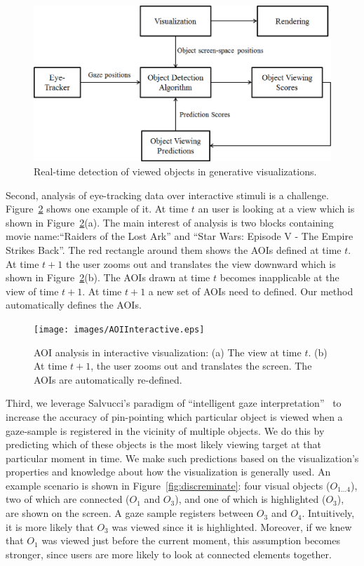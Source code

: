 \begin{figure}[htb]
  \centering
  \includegraphics[width=\linewidth]{images/systemBlockDiagram.eps}
  \caption{Real-time detection of viewed objects in generative visualizations.}
	\label{fig:systemBlockDiagram}
\end{figure}

Second, analysis of eye-tracking data over interactive stimuli is a challenge. Figure~\ref{fig:AOIInteractive} shows one example of it. At time $t$ an user is looking at a view which is shown in Figure~\ref{fig:AOIInteractive}(a). The main interest of analysis is two blocks containing movie name:``Raiders of the Lost Ark'' and ``Star Wars: Episode V - The Empire Strikes Back''. The red rectangle around them shows the AOIs defined at time $t$. At time $t+1$ the user zooms out and translates the view downward which is shown in Figure~\ref{fig:AOIInteractive}(b). The AOIs drawn at time $t$ becomes inapplicable at the view of time $t+1$. At time $t+1$ a new set of AOIs need to defined. Our method automatically defines the AOIs.

\begin{figure}[htb]
  \centering
  \texttt{[image: images/AOIInteractive.eps]}
  \caption{AOI analysis in interactive visualization: (a) The view at time $t$. (b) At time $t+1$, the user zooms out and translates the screen. The AOIs are automatically re-defined.}
	\label{fig:AOIInteractive}
\end{figure}

Third, we leverage Salvucci's paradigm of ``intelligent gaze interpretation''~\cite{salvucci2000intelligent} to increase the accuracy of pin-pointing which particular object is viewed when a gaze-sample is registered in the vicinity of multiple objects. We do this by predicting which of these objects is the most likely viewing target at that particular moment in time. We make such predictions based on the visualization's properties and knowledge about how the visualization is generally used. An example scenario is shown in Figure~\ref{fig:discreminate}: four visual objects ($O_{1\ldots 4}$), two of which are connected ($O_1$ and $O_3$), and one of which is highlighted ($O_3$), are shown on the screen. A gaze sample registers between $O_3$ and $O_4$. Intuitively, it is more likely that $O_3$ was viewed since it is highlighted. Moreover, if we knew that $O_1$ was viewed just before the current moment, this assumption becomes stronger, since users are more likely to look at connected elements together. 


